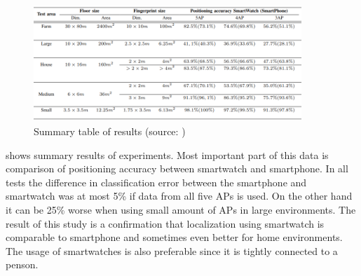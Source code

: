 \begin{figure}[H]
	\begin{centering}
		\includegraphics[width=0.9\textwidth]{img/smartwatch_vs_smartphone}
		\par\end{centering}
	\caption{Summary table of results (source: \cite{SWvsSP})\label{fig:SWvsSP}}
	\label{fig02c03}
\end{figure}

 shows summary results of experiments. Most important part of this data is comparison of positioning accuracy between smartwatch and smartphone. In all tests the difference in classification error between the smartphone and smartwatch was at most 5\% if data from all five APs is used. On the other hand it can be 25\% worse when using small amount of APs in large environments. The result of this study is a confirmation that localization using smartwatch is comparable to smartphone and sometimes even better for home environments. The usage of smartwatches is also preferable since it is tightly connected to a penson.
